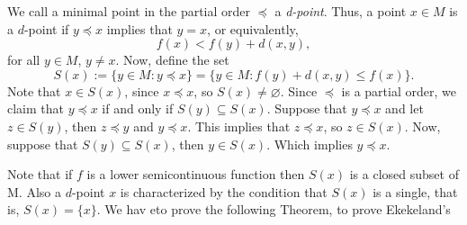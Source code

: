     We call a minimal point in the partial order $\preceq$ a \textit{d-point}.
    Thus, a point $x \in M$ is a $d$-point if $y \preceq x$ implies that $y = 
    x$,
    or equivalently,
    $$
        f(x) < f(y) + d(x,y),
    $$
    for all $y \in M$, $y \neq x$. Now, define the set 
    $$
        S(x) := \{ y \in M : y \preceq x\} =%
                \{ y \in M : f(y) + d(x,y) \leq f(x) \}.
    $$
    Note that $x \in S(x)$, since $x \preceq x$, so $S(x) \neq \varnothing$. 
    Since 
    $\preceq$ is a partial order, we claim that $y \preceq x$ if and only if
    $S(y) \subseteq S(x)$. Suppose that $y \preceq x $ and let $z \in S(y)$, 
    then
    $z \preceq y$ and $y \preceq x$. This implies that $z \preceq x$, so $z \in 
    S(x)$.
    Now, suppose that $S(y) \subseteq S(x)$, then $y \in S(x)$. Which implies
    $y \preceq x$.
    
    Note that if $f$ is a lower semicontinuous function then $S(x)$ is a closed 
    subset of M. Also a $d$-point $x$ is characterized by the condition that
    $S(x)$ is  a single, that is, $S(x) = \{ x \}$. 
    We hav eto prove the following Theorem, to prove Ekekeland's
    
